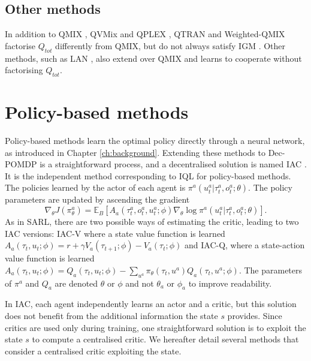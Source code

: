 \subsection{Other methods}
In addition to QMIX \citep{Rashid2018}, QVMix \citep{leroy2020qvmix} and QPLEX \citep{wang2021qplex}, QTRAN \citep{Son2019QTRAN:Learning} and Weighted-QMIX \citep{rashid2020weighted} factorise $Q_{tot}$ differently from QMIX, but do not always satisfy IGM \citep{Son2019QTRAN:Learning}.
Other methods, such as LAN \citep{avalos2023local}, also extend over QMIX and learns to cooperate without factorising $Q_{tot}$.

\section{Policy-based methods}
\label{sec:ch3_policy}

Policy-based methods learn the optimal policy directly through a neural network, as introduced in Chapter \ref{ch:background}.
Extending these methods to Dec-POMDP is a straightforward process, and a decentralised solution is named IAC \citep{foerster2017coma}. 
It is the independent method corresponding to IQL for policy-based methods.
The policies learned by the actor of each agent is $\pi^{a}(u_t^{a}|\tau_t^{a}, o^a_t;\theta)$.
The policy parameters are updated by ascending the gradient
\begin{equation}
\label{eq:ch3_policy_grad}
    \nabla_\theta J(\pi^a_\theta) = \mathbb{E}_B\left[A_a(\tau^{a}_t, o_t^a, u_t^{a}; \phi) \nabla_{\theta} \log \pi^{a}(u_t^{a}|\tau_t^{a},  o_t^a;\theta)\right].
\end{equation}
As in SARL, there are two possible ways of estimating the critic, leading to two IAC versions: IAC-V where a state value function is learned $A_a(\tau_t, u_t; \phi) = r + \gamma V_a(\tau_{t+1}; \phi) - V_a(\tau_t; \phi)$ and IAC-Q, where a state-action value function is learned $A_a(\tau_t, u_t; \phi) = Q_a(\tau_t, u_t; \phi) - \sum_{u^a}\pi_\theta(\tau_t, u^a)Q_a(\tau_t, u^a; \phi)$.
The parameters of $\pi^a$ and $Q_a$ are denoted $\theta$ or $\phi$ and not $\theta_a$ or $\phi_a$ to improve readability.

In IAC, each agent independently learns an actor and a critic, but this solution does not benefit from the additional information the state $s$ provides.
Since critics are used only during training, one straightforward solution is to exploit the state $s$ to compute a centralised critic.
We hereafter detail several methods that consider a centralised critic exploiting the state.

